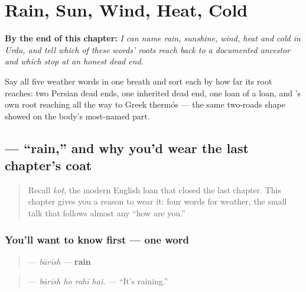 
\chapter{Rain, Sun, Wind, Heat, Cold}
\label{ch:ur-weather}

\begin{chapteropening}
\textbf{By the end of this chapter:} \emph{I can name rain, sunshine, wind, heat and cold in Urdu, and tell which of these words' roots reach back to a documented ancestor and which stop at an honest dead end.}

Say all five weather words in one breath and sort each by how far its root reaches: two Persian dead ends, one inherited dead end, one loan of a loan, and 's own root reaching all the way to Greek thermós — the same two-roads shape  showed on the body's most-named part.
\end{chapteropening}

\section[\texorpdfstring{\ur{بارش} (bārish)}{بارش (bārish)}]{ — \textquotedblleft{}rain,\textquotedblright{} and why you'd wear the last chapter's coat}

\label{lesson:UR-C15-barish}



\begin{quote}
Recall \emph{koṭ}, the modern English loan that closed the last chapter. This chapter gives you a reason to wear it: four words for weather, the small talk that follows almost any \textquotedblleft{}how are you.\textquotedblright{}
\end{quote}

\subsection*{You'll want to know first — one word}
\begin{quote}
\textbf{} — \emph{bārish} — \textbf{rain}
\end{quote}

\begin{quote}
\textbf{   } — \emph{bārish ho rahī hai.} — \textquotedblleft{}It's raining.\textquotedblright{}
\end{quote}

